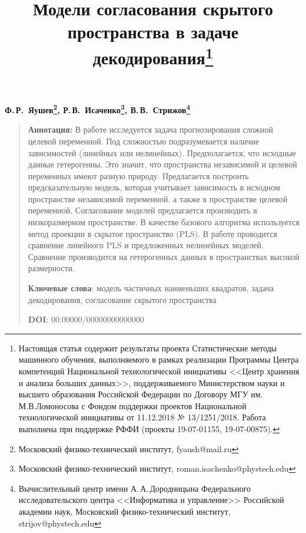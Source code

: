 \documentclass[12pt]{article}
\begin{document}
	\title{Модели согласования скрытого пространства в задаче декодирования\thanks{Настоящая статья содержит результаты проекта Статистические методы машинного обучения, выполняемого в рамках реализации Программы Центра компетенций Национальной технологической инициативы <<Центр хранения и анализа больших данных>>, поддерживаемого Министерством науки и высшего образования Российской Федерации по Договору МГУ им. М.В.Ломоносова с Фондом поддержки проектов Национальной технологической инициативы от 11.12.2018 № 13/1251/2018. Работа выполнена при поддержке РФФИ (проекты 19-07-01155, 19-07-00875).}}
	\date{}
	\author{}
	\maketitle
	
	\begin{center}
		\bf
		Ф.\,Р.~Яушев\footnote{Московский физико-технический институт, fyaush@mail.ru}, 
		Р.\,В.~Исаченко\footnote{Московский физико-технический институт, roman.isachenko@phystech.edu}, 
		В.\,В.~Стрижов\footnote{Вычислительный центр имени А.\,А.\,Дородницына Федерального исследовательского центра <<Информатика и управление>> Российской академии наук, Московский физико-технический институт, strijov@phystech.edu}
	\end{center}
	{\begin{quote}
			\textbf{Аннотация:}
			В работе исследуется задача прогнозирования сложной целевой переменной. 
			Под сложностью подразумевается наличие зависимостей (линейных или нелинейных). Предполагается, что исходные данные гетерогенны. Это значит, что пространства независимой и целевой переменных имеют разную природу. Предлагается построить предсказательную модель, которая учитывает зависимость в исходном пространстве независимой переменной, а также в пространстве целевой переменной. Согласование моделей предлагается производить в низкоразмерном пространстве. В качестве базового алгоритма используется метод проекции в скрытое пространство (PLS). В работе проводится сравнение линейного PLS и предложенных нелинейных моделей. Сравнение производится на гетерогенных данных в пространствах высокой размерности.
			
			\smallskip
			\textbf{Ключевые слова}: модель частичных наименьших квадратов, задача декодирования, согласование скрытого пространства
			\smallskip
			
			\textbf{DOI}: 00.00000/00000000000000
		\end{quote}
	}
\end{document}
